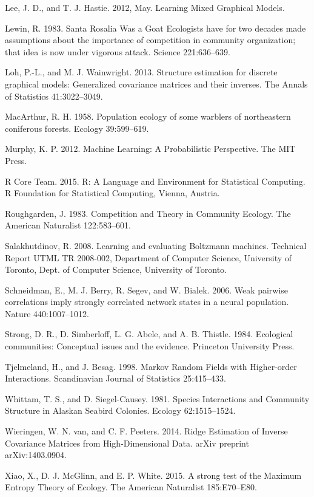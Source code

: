 \documentclass[12pt,]{article}
\begin{document}
\begin{spacing}{1.9}
\begin{flushleft}
Lee, J. D., and T. J. Hastie. 2012, May. Learning Mixed Graphical
Models.

Lewin, R. 1983. Santa Rosalia Was a Goat Ecologists have for two decades
made assumptions about the importance of competition in community
organization; that idea is now under vigorous attack. Science
221:636--639.

Loh, P.-L., and M. J. Wainwright. 2013. Structure estimation for
discrete graphical models: Generalized covariance matrices and their
inverses. The Annals of Statistics 41:3022--3049.

MacArthur, R. H. 1958. Population ecology of some warblers of
northeastern coniferous forests. Ecology 39:599--619.

Murphy, K. P. 2012. Machine Learning: A Probabilistic Perspective. The
MIT Press.

R Core Team. 2015. R: A Language and Environment for Statistical
Computing. R Foundation for Statistical Computing, Vienna, Austria.

Roughgarden, J. 1983. Competition and Theory in Community Ecology. The
American Naturalist 122:583--601.

Salakhutdinov, R. 2008. Learning and evaluating Boltzmann machines.
Technical Report UTML TR 2008-002, Department of Computer Science,
University of Toronto, Dept. of Computer Science, University of Toronto.

Schneidman, E., M. J. Berry, R. Segev, and W. Bialek. 2006. Weak
pairwise correlations imply strongly correlated network states in a
neural population. Nature 440:1007--1012.

Strong, D. R., D. Simberloff, L. G. Abele, and A. B. Thistle. 1984.
Ecological communities: Conceptual issues and the evidence. Princeton
University Press.

Tjelmeland, H., and J. Besag. 1998. Markov Random Fields with
Higher-order Interactions. Scandinavian Journal of Statistics
25:415--433.

Whittam, T. S., and D. Siegel-Causey. 1981. Species Interactions and
Community Structure in Alaskan Seabird Colonies. Ecology 62:1515--1524.

Wieringen, W. N. van, and C. F. Peeters. 2014. Ridge Estimation of
Inverse Covariance Matrices from High-Dimensional Data. arXiv preprint
arXiv:1403.0904.

Xiao, X., D. J. McGlinn, and E. P. White. 2015. A strong test of the
Maximum Entropy Theory of Ecology. The American Naturalist 185:E70--E80.
\end{flushleft}
\end{spacing}
\end{document}
